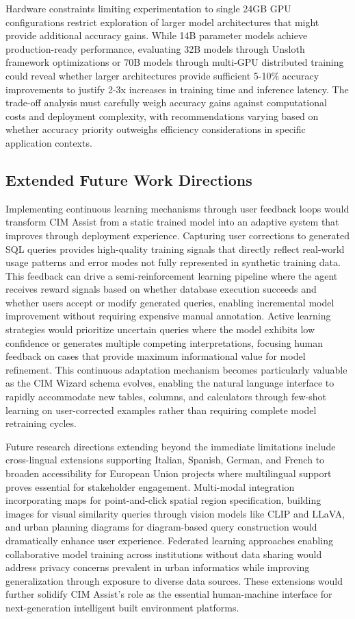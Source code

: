 Hardware constraints limiting experimentation to single 24GB GPU configurations restrict exploration of larger model architectures that might provide additional accuracy gains. While 14B parameter models achieve production-ready performance, evaluating 32B models through Unsloth framework optimizations or 70B models through multi-GPU distributed training could reveal whether larger architectures provide sufficient 5-10\% accuracy improvements to justify 2-3x increases in training time and inference latency. The trade-off analysis must carefully weigh accuracy gains against computational costs and deployment complexity, with recommendations varying based on whether accuracy priority outweighs efficiency considerations in specific application contexts.

\subsection{Extended Future Work Directions}

Implementing continuous learning mechanisms through user feedback loops would transform CIM Assist from a static trained model into an adaptive system that improves through deployment experience. Capturing user corrections to generated SQL queries provides high-quality training signals that directly reflect real-world usage patterns and error modes not fully represented in synthetic training data. This feedback can drive a semi-reinforcement learning pipeline where the agent receives reward signals based on whether database execution succeeds and whether users accept or modify generated queries, enabling incremental model improvement without requiring expensive manual annotation. Active learning strategies would prioritize uncertain queries where the model exhibits low confidence or generates multiple competing interpretations, focusing human feedback on cases that provide maximum informational value for model refinement. This continuous adaptation mechanism becomes particularly valuable as the CIM Wizard schema evolves, enabling the natural language interface to rapidly accommodate new tables, columns, and calculators through few-shot learning on user-corrected examples rather than requiring complete model retraining cycles.

Future research directions extending beyond the immediate limitations include cross-lingual extensions supporting Italian, Spanish, German, and French to broaden accessibility for European Union projects where multilingual support proves essential for stakeholder engagement. Multi-modal integration incorporating maps for point-and-click spatial region specification, building images for visual similarity queries through vision models like CLIP and LLaVA, and urban planning diagrams for diagram-based query construction would dramatically enhance user experience. Federated learning approaches enabling collaborative model training across institutions without data sharing would address privacy concerns prevalent in urban informatics while improving generalization through exposure to diverse data sources. These extensions would further solidify CIM Assist's role as the essential human-machine interface for next-generation intelligent built environment platforms.


